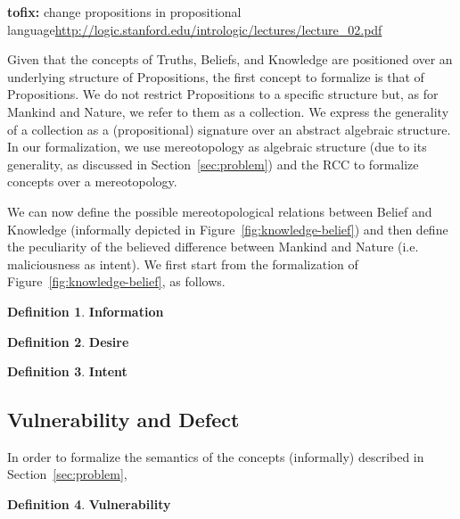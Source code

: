 \documentclass{article}
\newcommand{\fix}[2]{{\color{red} {\bf tofix:} #2}}
\theoremstyle{definition}
\newtheorem{definition}{Definition}[section]
\theoremstyle{corollary}
\theoremstyle{lemma}
\theoremstyle{theorem}
\theoremstyle{theorem}
\begin{document}
\fix{mr}{change propositions in propositional language\url{http://logic.stanford.edu/intrologic/lectures/lecture_02.pdf}}

Given that the concepts of Truths, Beliefs, and Knowledge are positioned over
an underlying structure of Propositions, the first concept to formalize is that
of Propositions. We do not restrict Propositions to a specific structure but,
as for Mankind and Nature, we refer to them as a collection.  We express the
generality of a collection as a (propositional) signature over an abstract
algebraic structure. In our formalization, we use mereotopology as algebraic
structure (due to its generality, as discussed in Section~\ref{sec:problem})
and the RCC to formalize concepts over a mereotopology. 


We can now define the possible mereotopological relations between Belief and
Knowledge (informally depicted in Figure~\ref{fig:knowledge-belief}) and then
define the peculiarity of the believed difference between Mankind and Nature 
(i.e. maliciousness as intent). 
We first start from the formalization of Figure~\ref{fig:knowledge-belief}, as
follows.  



\begin{definition}{\bf Information}\label{def:information}
\end{definition}
\begin{definition}{\bf Desire}\label{def:desire}
\end{definition}
\begin{definition}{\bf Intent}\label{def:intent}
\end{definition}

\subsection{Vulnerability and Defect}\label{sec:vulnerability-defect}
In order to formalize the semantics of the concepts (informally) described in
Section~\ref{sec:problem}, 



\begin{definition}{\bf Vulnerability}
\end{definition}
\end{document}
